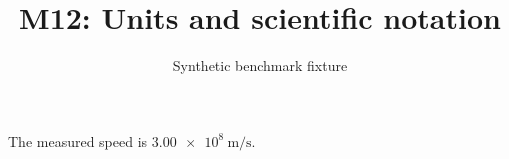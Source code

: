 \documentclass{article}
\title{M12: Units and scientific notation}
\author{Synthetic benchmark fixture}
\date{}
\begin{document}
\maketitle
The measured speed is \(\qty{3.00e8}{\metre\per\second}\).
\end{document}
